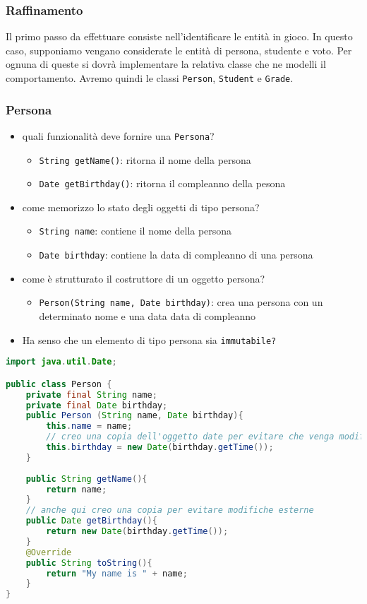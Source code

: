 \documentclass{article}
\begin{document}
\subsubsection{Raffinamento}
Il primo passo da effettuare consiste nell'identificare le entità in gioco.
In questo caso, supponiamo vengano considerate le entità di persona, studente e voto.
Per ognuna di queste si dovrà implementare la relativa classe che ne modelli il comportamento.
Avremo quindi le classi \texttt{Person}, \texttt{Student} e \texttt{Grade}.

\subsubsection{Persona}
\begin{itemize}
\item quali funzionalit\`a deve fornire una \texttt{Persona}?
\begin{itemize}
\item \texttt{String getName()}: ritorna il nome della persona
\item \texttt{Date getBirthday()}: ritorna il compleanno della pesona
\end{itemize}
\item come memorizzo lo stato degli oggetti di tipo persona?
\begin{itemize}
\item \texttt{String name}: contiene il nome della persona
\item \texttt{Date birthday}: contiene la data di compleanno di una persona
\end{itemize}
\item come \`e strutturato il costruttore di un oggetto persona?
\begin{itemize}
\item \texttt{Person(String name, Date birthday)}: crea una persona con un determinato nome e una data data di compleanno
\end{itemize}
\item Ha senso che un elemento di tipo persona sia \texttt{immutabile?}
\end{itemize}

\begin{lstlisting}[language=Java,escapechar=|]
import java.util.Date;

public class Person {
	private final String name;
	private final Date birthday;
	public Person (String name, Date birthday){
		this.name = name;
		// creo una copia dell'oggetto date per evitare che venga modificato dall'esterno
		this.birthday = new Date(birthday.getTime());		
	}
	
	public String getName(){
		return name;
	}
	// anche qui creo una copia per evitare modifiche esterne
	public Date getBirthday(){
		return new Date(birthday.getTime());
	}
	@Override
	public String toString(){
		return "My name is " + name;
	}
}
\end{lstlisting}
\end{document}
